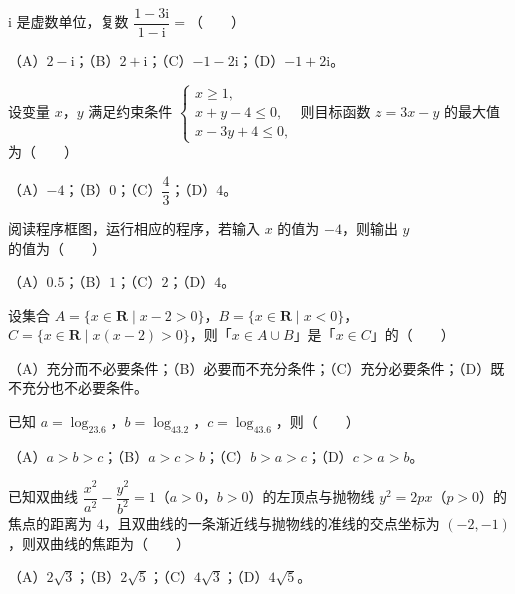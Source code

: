 

\begin{question}
$\mathrm i$ 是虚数单位，复数 $\dfrac{1-3\mathrm i}{1-\mathrm i}=$\mbox{（　　）}

（A）$2-\mathrm i$；（B）$2+\mathrm i$；（C）$-1-2\mathrm i$；（D）$-1+2\mathrm i$。
\end{question}
\begin{question}
设变量 $x$，$y$ 满足约束条件 $\begin{cases}x\geqslant1,\\ x+y-4\leqslant0,\\ x-3y+4\leqslant0,\end{cases}$ 则目标函数 $z=3x-y$ 的最大值为\mbox{（　　）}

（A）$-4$；（B）$0$；（C）$\dfrac43$；（D）$4$。
\Needspace{0.4\textheight}
\end{question}
\begin{question}
阅读程序框图，运行相应的程序，若输入 $x$ 的值为 $-4$，则输出 $y$ 的值为\mbox{（　　）}
\nopagebreak[4]
\begin{center}\end{center}
\nopagebreak[4]
（A）$0.5$；（B）$1$；（C）$2$；（D）$4$。
\end{question}
\begin{question}
设集合 $A=\{x\in\mathbf R\mid x-2>0\}$，$B=\{x\in\mathbf R\mid x<0\}$，$C=\{x\in\mathbf R\mid x(x-2)>0\}$，则「$x\in A\cup B$」是「$x\in C$」的\mbox{（　　）}

（A）充分而不必要条件；（B）必要而不充分条件；（C）充分必要条件；（D）既不充分也不必要条件。
\end{question}
\begin{question}
已知 $a=\log_23.6$，$b=\log_43.2$，$c=\log_43.6$，则\mbox{（　　）}

（A）$a>b>c$；（B）$a>c>b$；（C）$b>a>c$；（D）$c>a>b$。
\end{question}
\begin{question}
已知双曲线 $\dfrac{x^2}{a^2}-\dfrac{y^2}{b^2}=1$（$a>0$，$b>0$）的左顶点与抛物线 $y^2=2px$（$p>0$）的焦点的距离为 $4$，且双曲线的一条渐近线与抛物线的准线的交点坐标为 $(-2,-1)$，则双曲线的焦距为\mbox{（　　）}

（A）$2\sqrt3$；（B）$2\sqrt5$；（C）$4\sqrt3$；（D）$4\sqrt5$。
\end{question}
